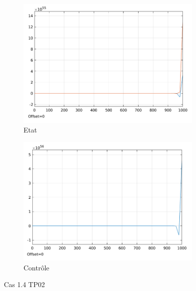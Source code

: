 \documentclass[a4paper]{article}
\begin{document}
                        \begin{figure}[h!]
                                \centering
                                \begin{subfigure}[b]{0.45\textwidth}
                                        \includegraphics[width=\textwidth]{images/courbe_cas_1_4_TP02.png}
                                        \caption{Etat}
                                        \label{fig_cas_1.4_TP02_etats}
                                \end{subfigure}
                                \hspace{30pt}
                                \begin{subfigure}[b]{0.45\textwidth}
                                        \includegraphics[width=\textwidth]{images/controle_cas_1_4_TP02.png}
                                        \caption{Contrôle}
                                        \label{fig_cas_1.4_TP02_controle}
                                \end{subfigure}
                                \caption{Cas 1.4 TP02}
                                \label{fig_cas_1.4_TP02}
                        \end{figure}
\end{document}
